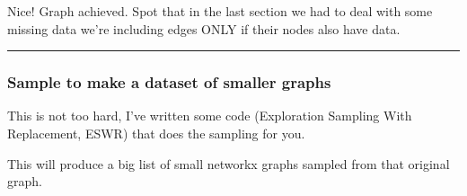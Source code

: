 \documentclass[letterpaper,10pt,english]{sphinxhowto}
\begin{document}
\sphinxAtStartPar
Nice! Graph achieved. Spot that in the last section we had to deal with some missing data \sphinxhyphen{} we’re including edges ONLY if their nodes also have data.


\bigskip\hrule\bigskip



\subsubsection{Sample to make a dataset of smaller graphs}
\label{\detokenize{reddit-dataset-example:Sample-to-make-a-dataset-of-smaller-graphs}}
\sphinxAtStartPar
This is not too hard, I’ve written some code (Exploration Sampling With Replacement, ESWR) that does the sampling for you.

\sphinxAtStartPar
This will produce a big list of small networkx graphs sampled from that original graph.
\end{document}

